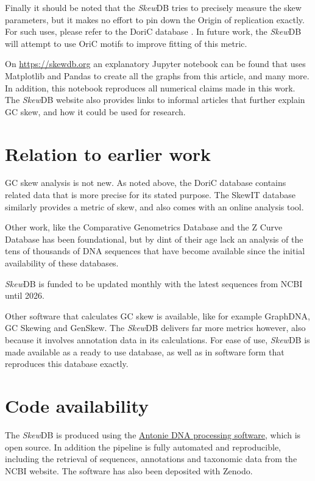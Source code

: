 \documentclass[fleqn,10pt]{wlscirep}
\begin{document}
Finally it should be noted that the \emph{Skew}DB tries to precisely measure the skew parameters, but it makes no effort to pin down the Origin of replication exactly. For such uses, please refer to the DoriC database \cite{luo_doric_2019}. In future work, the \emph{Skew}DB will attempt to use OriC motifs to improve fitting of this metric.

On \url{https://skewdb.org} an explanatory Jupyter \cite{Kluyver:2016aa} notebook can be found that uses Matplotlib \cite{Hunter:2007} and Pandas \cite{jeff_reback_2021_5203279} to create all the graphs from this article, and many more. In addition, this notebook reproduces all numerical claims made in this work. The \emph{Skew}DB website also provides links to informal articles that further explain GC skew, and how it could be used for research.

\section*{Relation to earlier work}
GC skew analysis is not new. As noted above, the DoriC database contains related data that is more precise for its stated purpose. The SkewIT database \cite{lu_skewit_2020} similarly provides a metric of skew, and also comes with an online analysis tool.

Other work, like the Comparative Genometrics Database\cite{Roten2002} and the Z Curve Database \cite{Zhang2003} has been foundational, but by dint of their age lack an analysis of the tens of thousands of DNA sequences that have become available since the initial availability of these databases.

\emph{Skew}DB is funded to be updated monthly with the latest sequences from NCBI until 2026.

Other software that calculates GC skew is available, like for example GraphDNA\cite{Thomas2007}, GC Skewing\cite{Grigoriev1998} and GenSkew. The \emph{Skew}DB delivers far more metrics however, also because it involves annotation data in its calculations. For ease of use, \emph{Skew}DB is made available as a ready to use database, as well as in software form that reproduces this database exactly.

\section*{Code availability}
The \emph{Skew}DB is produced using the \href{https://github.com/berthubert/antonie2}{Antonie DNA processing software}, which is open source. In addition the pipeline is fully automated and reproducible, including the retrieval of sequences, annotations and taxonomic data from the NCBI website. The software has also been deposited with Zenodo\cite{https://doi.org/10.5281/zenodo.5516524}.
\end{document}
